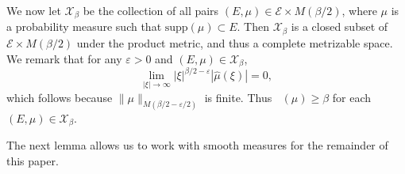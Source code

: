 \documentclass[12pt,reqno]{article}
\numberwithin{equation}{section}
\DeclareMathOperator{\fordim}{\dim_{\mathbf{F}}}
\newtheorem{theorem}{Theorem}
\begin{document}
We now let $\mathcal{X}_\beta$ be the collection of all pairs $(E,\mu) \in \mathcal{E} \times M(\beta/2)$, where $\mu$ is a probability measure such that $\text{supp}(\mu) \subset E$. Then $\mathcal{X}_\beta$ is a closed subset of $\mathcal{E} \times M(\beta/2)$ under the product metric, and thus a complete metrizable space. We remark that for any $\varepsilon > 0$ and $(E,\mu) \in \mathcal{X}_\beta$,
%
\begin{equation} \label{equationGFSCSC4}
    \lim_{|\xi| \to \infty} |\xi|^{\beta/2 - \varepsilon} |\widehat{\mu}(\xi)| = 0,
\end{equation}
%
which follows because $\| \mu \|_{M(\beta/2 - \varepsilon/2)}$ is finite. Thus $\fordim(\mu) \geq \beta$ for each $(E,\mu) \in \mathcal{X}_\beta$.
\begin{comment}
\begin{theorem}
    $\mathcal{X}$ is a closed subset of $\mathcal{E} \times M(\beta)$.
\end{theorem}
\begin{proof}
    Suppose $\{ (E_k,\mu_k) \}$ is a sequence of elements of $\mathcal{X}$ converging to some tuple $(E,\mu) \in \mathcal{E} \times M(\beta)$. Fix $\varepsilon > 0$. Since $E_k \to E$ in the Hausdorff dimension, there exists $k_0$ such that for $k \geq k_0$, $E_k \subset E(\varepsilon)$. Since $\mu_k \to \mu$ weakly, this implies that $\mu$ is a probability measure, and that $\text{supp}(\mu) \subset E(\varepsilon)$. Taking $\varepsilon \to 0$ shows that $\text{supp}(\mu) \subset E$. Again for a fixed $\varepsilon > 0$, applying the triangle inequality and the reverse triangle inequality combined with \eqref{equationGFSCSC4} applied to $\mu_k$, we conclude
    \[ \lim_{|\xi| \to \infty} |\xi|^{\beta/2 - \varepsilon} |\widehat{\mu}(\xi)| = \lim_{|\xi| \to \infty} |\xi|^{\beta/2 - \varepsilon} |\widehat{\mu}(\xi) - \widehat{\mu_k}(\xi)| \leq \| \mu - \mu_k \|_{M(\beta,\varepsilon)}. \]
    Taking $k \to \infty$ shows that
    \[ \lim_{|\xi| \to \infty} |\xi|^{\beta/2 - \varepsilon} |\widehat{\mu}(\xi)| = 0, \]
    which completes the proof.
\end{proof}
\end{comment}

The next lemma allows us to work with smooth measures for the remainder of this paper.
\end{document}
